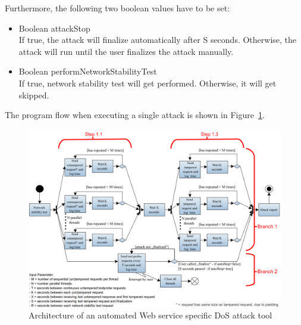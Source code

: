 \newpage
Furthermore, the following two boolean values have to be set: 
\begin{itemize}
  \item Boolean attackStop\\If true, the attack will finalize automatically after S seconds. Otherwise, the attack will run until the user finalizes the attack manually. 
  \item Boolean performNetworkStabilityTest\\If true, network stability test will get performed. Otherwise, it will get skipped.
\end{itemize}

The program flow when executing a single attack is shown in Figure~\ref{fig:architectureDosAttackTool}.
\begin{landscape}
  \begin{figure}[!ht]
	  \centering
	  \includegraphics[width=21cm]{img/architecture.png}
	  \caption{Architecture of an automated Web service specific DoS attack tool}
	  \label{fig:architectureDosAttackTool}
  \end{figure}
\end{landscape}

